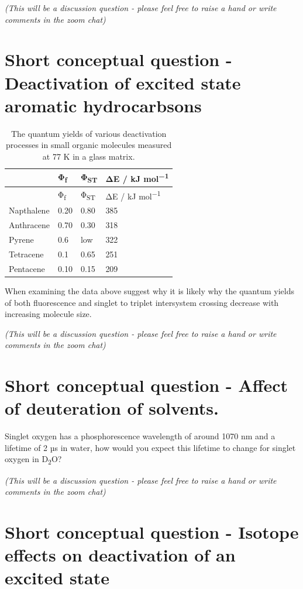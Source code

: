 \documentclass[
]{book}
\begin{document}
\emph{(This will be a discussion question - please feel free to raise a hand or write comments in the zoom chat)}

\hypertarget{sec:exhydrocarbons}{%
\section{Short conceptual question - Deactivation of excited state aromatic hydrocarbsons}\label{sec:exhydrocarbons}}

\begin{longtable}[]{@{}llll@{}}
\caption{\label{tab:smallmolQY} The quantum yields of various deactivation processes in small organic molecules measured at 77 K in a glass matrix.}\tabularnewline
\toprule
& Φ\textsubscript{f} & Φ\textsubscript{ST} & ΔE / kJ mol\textsuperscript{−1}\tabularnewline
\midrule
\endfirsthead
\toprule
& Φ\textsubscript{f} & Φ\textsubscript{ST} & ΔE / kJ mol\textsuperscript{−1}\tabularnewline
\midrule
\endhead
Napthalene & 0.20 & 0.80 & 385\tabularnewline
Anthracene & 0.70 & 0.30 & 318\tabularnewline
Pyrene & 0.6 & low & 322\tabularnewline
Tetracene & 0.1 & 0.65 & 251\tabularnewline
Pentacene & 0.10 & 0.15 & 209\tabularnewline
\bottomrule
\end{longtable}

When examining the data above suggest why it is likely why the quantum yields of both fluorescence and singlet to triplet intersystem crossing decrease with increasing molecule size.

\emph{(This will be a discussion question - please feel free to raise a hand or write comments in the zoom chat)}

\hypertarget{sec:dsolvent}{%
\section{Short conceptual question - Affect of deuteration of solvents.}\label{sec:dsolvent}}

Singlet oxygen has a phosphorescence wavelength of around 1070 nm and a lifetime of 2 µs in water, how would you expect this lifetime to change for singlet oxygen in D\textsubscript{2}O?

\emph{(This will be a discussion question - please feel free to raise a hand or write comments in the zoom chat)}

\hypertarget{sec:isotope}{%
\section{Short conceptual question - Isotope effects on deactivation of an excited state}\label{sec:isotope}}
\end{document}
